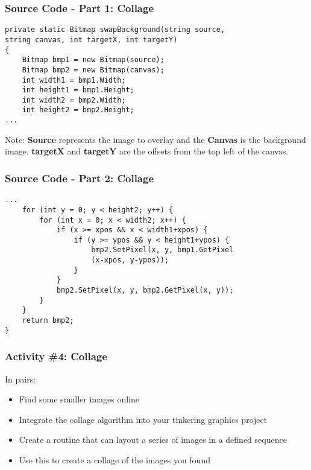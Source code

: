 \begin{frame}[fragile]
	\frametitle{Source Code - Part 1: Collage}
	
\begin{lstlisting}
private static Bitmap swapBackground(string source, 
string canvas, int targetX, int targetY)
{
	Bitmap bmp1 = new Bitmap(source);
	Bitmap bmp2 = new Bitmap(canvas);
	int width1 = bmp1.Width;
	int height1 = bmp1.Height;
	int width2 = bmp2.Width;
	int height2 = bmp2.Height;
...	
\end{lstlisting}
Note: \textbf{Source} represents the image to overlay and the \textbf{Canvas} is the background image. \textbf{targetX} and \textbf{targetY} are the offsets from the top left of the canvas.

\end{frame}

\begin{frame}[fragile]
	\frametitle{Source Code - Part 2: Collage}
	
	\begin{lstlisting}
...	
	for (int y = 0; y < height2; y++) {
		for (int x = 0; x < width2; x++) {
			if (x >= xpos && x < width1+xpos) {
				if (y >= ypos && y < height1+ypos) {
					bmp2.SetPixel(x, y, bmp1.GetPixel
					(x-xpos, y-ypos));
				}
			}
			bmp2.SetPixel(x, y, bmp2.GetPixel(x, y));
		}
	}
	return bmp2;
}
	\end{lstlisting}
	
\end{frame}


\begin{frame}
	\frametitle{Activity \#4: Collage}
	
	In pairs:
	
	\vspace{2em}
	
	\begin{itemize}		
		\item Find some smaller images online
		\item Integrate the collage algorithm into your tinkering graphics project
		\item Create a routine that can layout a series of images in a defined sequence
		\item Use this to create a collage of the images you found
	\end{itemize}
\end{frame}

